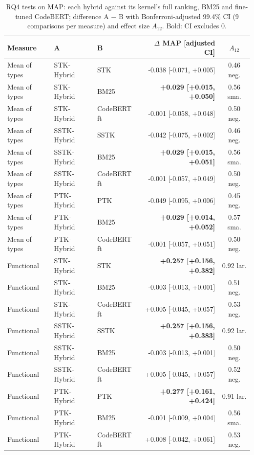 \begin{table}[!htbp]
\centering
\caption{RQ4 tests on MAP: each hybrid against its kernel's full ranking, BM25 and fine-tuned CodeBERT; difference A $-$ B with Bonferroni-adjusted 99.4\% CI (9 comparisons per measure) and effect size $A_{12}$. Bold: CI excludes 0.}
\label{tab:rq4effects}
\footnotesize
\setlength{\tabcolsep}{4pt}
\begin{tabular}{lllrc}
\toprule
Measure & A & B & $\Delta$ MAP [adjusted CI] & $A_{12}$ \\
\midrule
Mean of types & STK-Hybrid & STK & -0.038 [-0.071, +0.005] & 0.46 neg. \\
Mean of types & STK-Hybrid & BM25 & \textbf{+0.029 [+0.015, +0.050]} & 0.56 sma. \\
Mean of types & STK-Hybrid & CodeBERT ft & -0.001 [-0.058, +0.048] & 0.50 neg. \\
Mean of types & SSTK-Hybrid & SSTK & -0.042 [-0.075, +0.002] & 0.46 neg. \\
Mean of types & SSTK-Hybrid & BM25 & \textbf{+0.029 [+0.015, +0.051]} & 0.56 sma. \\
Mean of types & SSTK-Hybrid & CodeBERT ft & -0.001 [-0.057, +0.049] & 0.50 neg. \\
Mean of types & PTK-Hybrid & PTK & -0.049 [-0.095, +0.006] & 0.45 neg. \\
Mean of types & PTK-Hybrid & BM25 & \textbf{+0.029 [+0.014, +0.052]} & 0.57 sma. \\
Mean of types & PTK-Hybrid & CodeBERT ft & -0.001 [-0.057, +0.051] & 0.50 neg. \\
\midrule
Functional & STK-Hybrid & STK & \textbf{+0.257 [+0.156, +0.382]} & 0.92 lar. \\
Functional & STK-Hybrid & BM25 & -0.003 [-0.013, +0.001] & 0.51 neg. \\
Functional & STK-Hybrid & CodeBERT ft & +0.005 [-0.045, +0.057] & 0.53 neg. \\
Functional & SSTK-Hybrid & SSTK & \textbf{+0.257 [+0.156, +0.383]} & 0.92 lar. \\
Functional & SSTK-Hybrid & BM25 & -0.003 [-0.013, +0.001] & 0.50 neg. \\
Functional & SSTK-Hybrid & CodeBERT ft & +0.005 [-0.045, +0.057] & 0.52 neg. \\
Functional & PTK-Hybrid & PTK & \textbf{+0.277 [+0.161, +0.424]} & 0.91 lar. \\
Functional & PTK-Hybrid & BM25 & -0.001 [-0.009, +0.004] & 0.56 sma. \\
Functional & PTK-Hybrid & CodeBERT ft & +0.008 [-0.042, +0.061] & 0.53 neg. \\
\bottomrule
\end{tabular}
\end{table}
